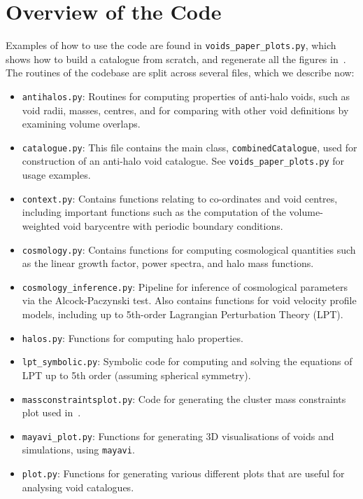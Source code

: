 \documentclass{article}
\newcommand{\codefont}[1]{{\texttt{#1}}}
\begin{document}
	\section{Overview of the Code}
	
	Examples of how to use the code are found in \codefont{voids\_paper\_plots.py}, which shows how to build a catalogue from scratch, and regenerate all the figures in~\citet{10.1093/mnras/stae1251}. The routines of the codebase are split across several files, which we describe now:
	
	\begin{itemize}
		\item \codefont{antihalos.py}: Routines for computing properties of anti-halo voids, such as void radii, masses, centres, and for comparing with other void definitions by examining volume overlaps.
		\item \codefont{catalogue.py}: This file contains the main class, \codefont{combinedCatalogue}, used for construction of an anti-halo void catalogue. See \codefont{voids\_paper\_plots.py} for usage examples.
		\item \codefont{context.py}: Contains functions relating to co-ordinates and void centres, including important functions such as the computation of the volume-weighted void barycentre with periodic boundary conditions.
		\item \codefont{cosmology.py}: Contains functions for computing cosmological quantities such as the linear growth factor, power spectra, and halo mass functions.
		\item \codefont{cosmology\_inference.py}: Pipeline for inference of cosmological parameters via the Alcock-Paczynski test. Also contains functions for void velocity profile models, including up to 5th-order Lagrangian Perturbation Theory (LPT).
		\item \codefont{halos.py}: Functions for computing halo properties.
		\item \codefont{lpt\_symbolic.py}: Symbolic code for computing and solving the equations of LPT up to 5th order (assuming spherical symmetry).
		\item \codefont{massconstraintsplot.py}: Code for generating the cluster mass constraints plot used in~\citet{stopyra2021quantifying}.
		\item \codefont{mayavi\_plot.py}: Functions for generating 3D visualisations of voids and simulations, using \codefont{mayavi}.
		\item \codefont{plot.py}: Functions for generating various different plots that are useful for analysing void catalogues.

\end{itemize}
\end{document}
